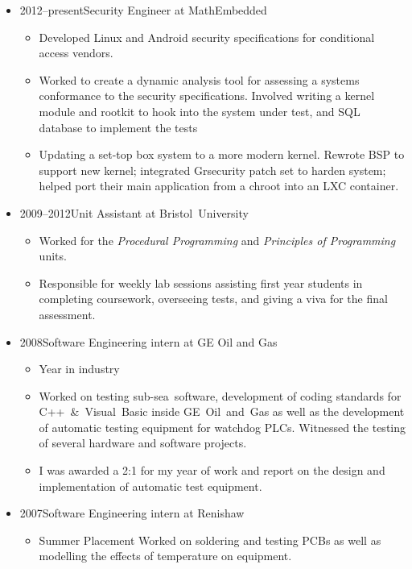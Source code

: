 \documentclass{book}
\newcommand{\lowercaps}[1]{\textsc{\MakeLowercase{#1}}}
\newcommand{\sideheading}[1]{\vspace{0.5em}\marginnote[\color{BrickRed}\raggedleft\lowercaps{#1}]{\raggedleft\lowercaps{#1}}}
\newcommand{\listhead}[1]{#1}
\begin{document}
\begin{itemize}
  \item 
    \sideheading{Experience}%
    \listhead{2012–present\hspace{1em}Security Engineer at MathEmbedded}
    \begin{itemize}
      \item[] Developed Linux and Android security specifications for conditional access vendors.  
      \item[] Worked to create a dynamic analysis tool for assessing a systems
	      conformance to the security specifications.  Involved writing a
	      kernel module and rootkit to hook into the system under test, and
	      SQL database to implement the tests
      \item[] Updating a set-top box system to a more modern kernel.  Rewrote
	      BSP to support new kernel; integrated Grsecurity patch set to
	      harden system; helped port their main application from a chroot
	      into an LXC container.
    \end{itemize}

    \item\listhead{2009–2012\hspace{1em}Unit Assistant at Bristol~University}
    \begin{itemize}
      \item[] Worked for the \textit{Procedural Programming} and \textit{Principles of Programming} units.
      \item[] Responsible for weekly lab sessions assisting first year students
        in completing coursework, overseeing tests, and giving a viva for the
        final assessment.
    \end{itemize}

  \item \listhead{2008\hspace{1em}Software Engineering intern at GE Oil and Gas}
    \begin{itemize}
      \item[] Year in industry
      \item[] Worked on testing sub-sea~software, development of coding
        standards for C++~\&~Visual~Basic inside GE~Oil~and~Gas as well as the
        development of automatic testing equipment for watchdog PLCs.
        Witnessed the testing of several hardware and software
        projects.
      \item[] I was awarded a 2:1 for my year of work and report on the design
        and implementation of automatic test equipment.
    \end{itemize}

  \item \listhead{2007\hspace{1em}Software Engineering intern at Renishaw}
    \begin{itemize}
      \item[] Summer Placement Worked on soldering and testing PCBs as well
	      as modelling the effects of temperature on equipment.
    \end{itemize}
\end{itemize}
\end{document}
